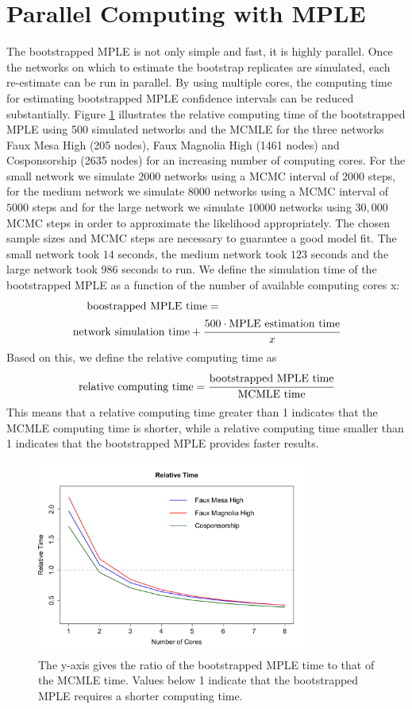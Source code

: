 \documentclass{llncs}
\begin{document}
\section{Parallel Computing with MPLE}
The bootstrapped MPLE is not only simple and fast, it is highly parallel. Once the networks on which to estimate the bootstrap replicates are simulated, each re-estimate can be run in parallel. By using multiple cores, the computing time for estimating bootstrapped MPLE confidence intervals can be reduced substantially. Figure \ref{comptime} illustrates the relative computing time of the bootstrapped MPLE using 500 simulated networks and the MCMLE for the three networks Faux Mesa High (205 nodes), Faux Magnolia High (1461 nodes) and Cosponsorship (2635 nodes) for an increasing number of computing cores. For the small network we simulate $2000$ networks using a MCMC interval of $2000$ steps, for the medium network we simulate $8000$ networks using a MCMC interval of $5000$ steps and for the large network we simulate $10000$ networks using $30,000$ MCMC steps in order to approximate the likelihood appropriately. The chosen sample sizes and MCMC steps are necessary to guarantee a good model fit. The small network took $14$ seconds, the medium network took $123$ seconds and the large network took $986$ seconds to run. We define the simulation time of the bootstrapped MPLE as a function of the number of available computing cores x:
\begin{equation*}
\begin{split}
\text{boostrapped MPLE time} = ~~~~~~~~~~~~~~~~~~~~~~~~~~~~~~~~~ \\ \text{network simulation time} + \cfrac{500 \cdot \text{MPLE estimation time}}{x}
\end{split}
\end{equation*}     
Based on this, we define the relative computing time as
$$\text{relative computing time}= \cfrac{\text{bootstrapped MPLE time}}{\text{MCMLE time}}$$
This means that a relative computing time greater than 1 indicates that the MCMLE computing time is shorter, while a relative computing time smaller than 1 indicates that the bootstrapped MPLE provides faster results. \\
\begin{figure}[!t]
\centering
\includegraphics[width=3.5in, height=2.5in]{rel_time}
\caption{The y-axis gives the ratio of the bootstrapped MPLE time to that of the MCMLE time. Values below 1 indicate that the bootstrapped MPLE requires a shorter computing time.}
\label{comptime}
\end{figure}
\end{document}
